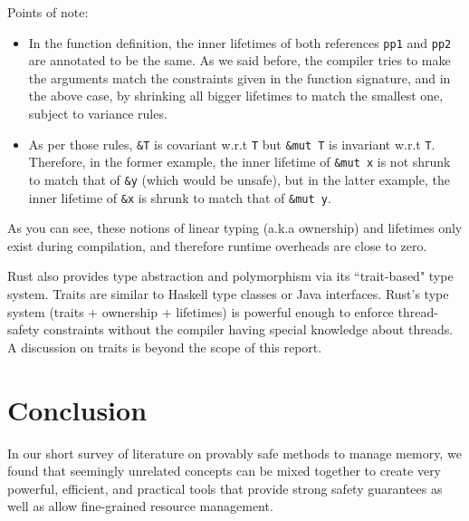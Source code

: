 \documentclass[11pt]{report}
\begin{document}
\noindent Points of note:
\begin{itemize}
\item In the function definition, the inner lifetimes of both references \texttt{pp1} and \texttt{pp2} are annotated to be the same. As we said before, the compiler tries to make the arguments match the constraints given in the function signature, and in the above case, by shrinking all bigger lifetimes to match the smallest one, subject to variance rules.
\item As per those rules, \texttt{\&T} is covariant w.r.t \texttt{T} but \texttt{\&mut T} is invariant w.r.t \texttt{T}. Therefore, in the former example, the inner lifetime of \texttt{\&mut x} is not shrunk to match that of \texttt{\&y} (which would be unsafe), but in the latter example, the inner lifetime of \texttt{\&x} is shrunk to match that of \texttt{\&mut y}.
\end{itemize}

As you can see, these notions of linear typing (a.k.a ownership) and lifetimes only exist during compilation, and therefore runtime overheads are close to zero.

Rust also provides type abstraction and polymorphism via its ``trait-based" type system. Traits are similar to Haskell type classes or Java interfaces. Rust's type system (traits + ownership + lifetimes) is powerful enough to enforce thread-safety constraints without the compiler having special knowledge about threads. A discussion on traits is beyond the scope of this report.

\chapter*{Conclusion}

In our short survey of literature on provably safe methods to manage memory, we found that seemingly unrelated concepts can be mixed together to create very powerful, efficient, and practical tools that provide strong safety guarantees as well as allow fine-grained resource management.
\end{document}
